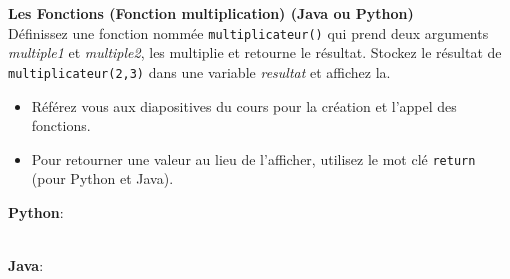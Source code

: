     \begin{Exercice}[5 minutes] \textbf{Les Fonctions (Fonction multiplication) (Java ou Python)}\\
    Définissez une fonction nommée \lstinline{multiplicateur()} qui prend deux arguments \textit{multiple1} et \textit{multiple2}, les multiplie et retourne le résultat. Stockez le résultat de \lstinline{multiplicateur(2,3)} dans une variable \textit{resultat} et affichez la.   \\

    \begin{conseil}
        \begin{itemize}
            \item Référez vous aux diapositives du cours pour la création et l'appel des fonctions.
            \item Pour retourner une valeur au lieu de l'afficher, utilisez le mot clé \lstinline{return} (pour Python et Java).
        \end{itemize}        
    \end{conseil}
    \begin{solution}
        \textbf{Python}:
        
        
        \textbf{\\Java}:
        
    \end{solution}   
\end{Exercice} 
  
